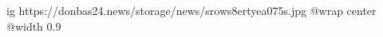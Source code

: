  
 
 
 
 

\ifcmt
  ig https://donbas24.news/storage/news/srows8ertyea075s.jpg
  @wrap center
  @width 0.9
\fi
